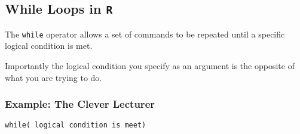 \subsection{While Loops in \texttt{R}}
The \texttt{while} operator allows a set of commands to be repeated until a specific logical condition is met.

Importantly the logical condition you specify as an argument is the opposite of what you are trying to do.
\subsubsection{Example: The Clever Lecturer}
\begin{framed}
\begin{verbatim}
while( logical condition is meet)
\end{verbatim}
\end{framed}
